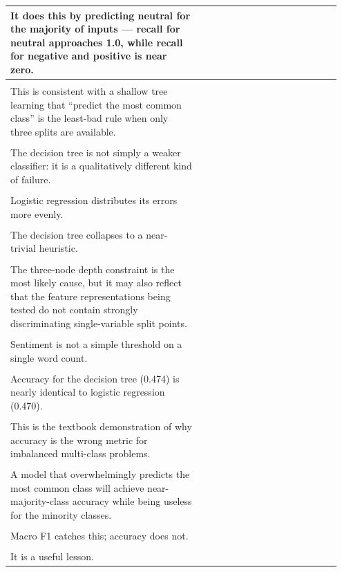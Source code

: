 \documentclass[11pt]{article}
\begin{document}
\begin{longtable}{|p{0.55\linewidth}|p{0.40\linewidth}|}
\hline
It does this by predicting neutral for the majority of inputs --- recall for neutral approaches 1.0, while recall for negative and positive is near zero. & \\[2pt]
\hline
\rule{0pt}{3.5cm} & \\
\hline
This is consistent with a shallow tree learning that ``predict the most common class'' is the least-bad rule when only three splits are available. & \\[2pt]
\hline
\rule{0pt}{3.5cm} & \\
\hline
The decision tree is not simply a weaker classifier: it is a qualitatively different kind of failure. & \\[2pt]
\hline
\rule{0pt}{3.5cm} & \\
\hline
Logistic regression distributes its errors more evenly. & \\[2pt]
\hline
\rule{0pt}{3.5cm} & \\
\hline
The decision tree collapses to a near-trivial heuristic. & \\[2pt]
\hline
\rule{0pt}{3.5cm} & \\
\hline
The three-node depth constraint is the most likely cause, but it may also reflect that the feature representations being tested do not contain strongly discriminating single-variable split points. & \\[2pt]
\hline
\rule{0pt}{3.5cm} & \\
\hline
Sentiment is not a simple threshold on a single word count. & \\[2pt]
\hline
\rule{0pt}{3.5cm} & \\
\hline
Accuracy for the decision tree (0.474) is nearly identical to logistic regression (0.470). & \\[2pt]
\hline
\rule{0pt}{3.5cm} & \\
\hline
This is the textbook demonstration of why accuracy is the wrong metric for imbalanced multi-class problems. & \\[2pt]
\hline
\rule{0pt}{3.5cm} & \\
\hline
A model that overwhelmingly predicts the most common class will achieve near-majority-class accuracy while being useless for the minority classes. & \\[2pt]
\hline
\rule{0pt}{3.5cm} & \\
\hline
Macro F1 catches this; accuracy does not. & \\[2pt]
\hline
\rule{0pt}{3.5cm} & \\
\hline
It is a useful lesson. & \\[2pt]

\end{longtable}
\end{document}
